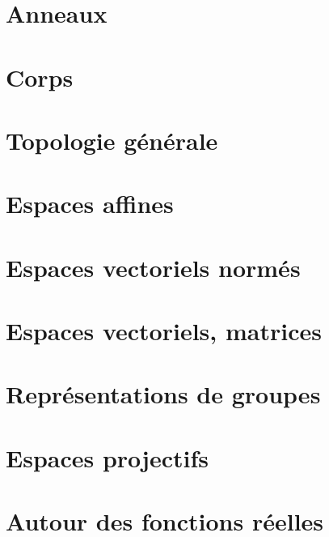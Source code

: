 \chapter{Anneaux}


\chapter{Corps}





\chapter{Topologie générale}



\chapter{Espaces affines}


\chapter{Espaces vectoriels normés}



\chapter{Espaces vectoriels, matrices}






\chapter{Représentations de groupes}


\chapter{Espaces projectifs}


\chapter{Autour des fonctions réelles}





